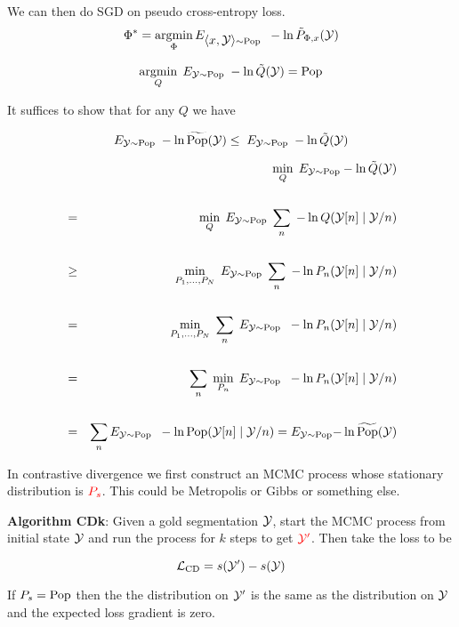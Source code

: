{We can then do SGD on pseudo cross-entropy loss.
\vfill
{\color{red} $$\Phi^* = \operatorname*{argmin}_\Phi E_{{\mbox{$\langle x,{\cal Y}\rangle$}} \sim \mathrm{Pop}}\;\;-\ln \tilde{P}_{\Phi,x}({\cal Y})$$}


{\color{red} $$\operatorname*{argmin}_Q \; E_{{\cal Y} \sim \mathrm{Pop}} \;-\ln \tilde{Q}({\cal Y}) = \mathrm{Pop}$$}

\vfill
It suffices to show that for any $Q$ we have

\vfill
$$ E_{{\cal Y} \sim \mathrm{Pop}}\;-\ln \widetilde{\mathrm{Pop}}({\cal Y}) \leq \;E_{{\cal Y} \sim \mathrm{Pop}}\;-\ln \tilde{Q}({\cal Y})$$


{\huge
\begin{eqnarray*}
  & & \min_Q \;E_{{\cal Y}\sim \mathrm{Pop}} -\ln \tilde{Q}({\cal Y}) \\
  \\
  & = & \min_Q \;E_{{\cal Y}\sim \mathrm{Pop}} \;\sum_n\;-\ln Q({\cal Y}[n]\;|\;{\cal Y}/n) \\
  \\
  & \geq & \min_{P_1,\ldots,P_N} \;E_{{\cal Y}\sim \mathrm{Pop}} \;\sum_n\;-\ln P_n({\cal Y}[n]\;|\;{\cal Y}/n) \\
  \\
  & = & \min_{P_1,\ldots,P_N} \;\sum_n \;E_{{\cal Y} \sim \mathrm{Pop}}\;\; -\ln P_n({\cal Y}[n]\;|\;{\cal Y}/n) \\
  \\          
  & = & \sum_n \;\min_{P_n}\;E_{{\cal Y} \sim \mathrm{Pop}}\;\; -\ln P_n({\cal Y}[n]\;|\;{\cal Y}/n) \\
  \\
    & = & \sum_n E_{{\cal Y} \sim \mathrm{Pop}}\;\; -\ln \mathrm{Pop}({\cal Y}[n]\;|\;{\cal Y}/n) =  E_{{\cal Y} \sim \mathrm{Pop}}{-\ln \widetilde{\mathrm{Pop}}({\cal Y})}
\end{eqnarray*}
}


In contrastive divergence we first construct an MCMC process whose stationary distribution is ${\color{red} P_s}$.  This could be
Metropolis or Gibbs or something else.

\vfill
{\bf Algorithm CDk}: Given a gold segmentation ${\cal Y}$, start the MCMC process from initial state ${\cal Y}$ and run the process for $k$ steps
to get ${\color{red} {\cal Y}'}$.  Then take the loss to be

\vfill
{\color{red} $${\cal L}_{\mathrm{CD}}  = s({\cal Y}') - s({\cal Y})$$}

If $P_s = \mathrm{Pop}$ then the the distribution on ${\cal Y}'$ is the same as the distribution on ${\cal Y}$ and the
expected loss gradient is zero.

}
